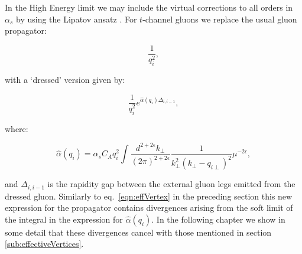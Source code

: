 		In the High Energy limit we may include the virtual corrections to all orders in $\alpha_s$ by using
		the Lipatov ansatz \cite{Kuraev:1976ge}.  For $t$-channel gluons we replace the usual
		gluon propagator:

		\begin{equation}
			\frac{1}{q_i^2},
		\end{equation}

		with a `dressed' version given by:

		\begin{equation}
			\frac{1}{q_i^2}e^{\hat{\alpha}(q_i)\Delta_{i,i-1}},
		\end{equation}

		where:

		\begin{equation}
			\hat{\alpha}(q_i) = \alpha_sC_Aq_i^2\int \frac{d^{2+2\epsilon}k_{\perp}}{(2\pi)^{2+2\epsilon}}
			\frac{1}{k^2_\perp(k_\perp - q_{i\perp})^2}\mu^{-2\epsilon},
		\end{equation}

		and $\Delta_{i,i-1}$ is the rapidity gap between the external gluon legs emitted from
		the dressed gluon.  Similarly to eq.~\eqref{eqn:effVertex} in the preceding section this
		new expression for the propagator contains divergences arising from the soft limit
		of the integral in the expression for $\hat{\alpha}(q_i)$.  In the following chapter we
		show in some detail that these divergences cancel with those mentioned in section
		\ref{sub:effectiveVertices}.


